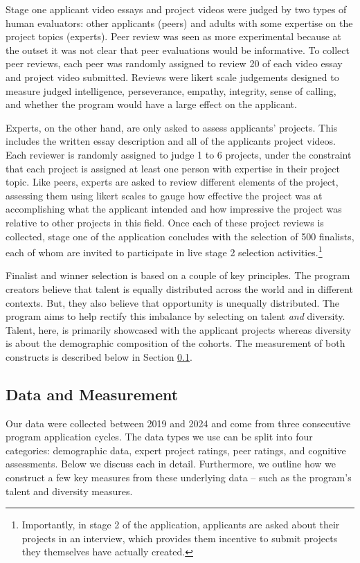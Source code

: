 Stage one applicant video essays and project videos were judged by two types of human evaluators: other applicants (peers) and adults with some expertise on the project topics (experts). Peer review was seen as more experimental because at the outset it was not clear that peer evaluations would be informative. To collect peer reviews, each peer was randomly assigned to review 20 of each video essay and project video submitted. Reviews were likert scale judgements designed to measure judged intelligence, perseverance, empathy, integrity, sense of calling, and whether the program would have a large effect on the applicant. 

Experts, on the other hand, are only asked to assess applicants' projects. This includes the written essay description and all of the applicants project videos. Each reviewer is randomly assigned to judge 1 to 6 projects, under the constraint that each project is assigned at least one person with expertise in their project topic. Like peers, experts are asked to review different elements of the project, assessing them using likert scales to gauge how effective the project was at accomplishing what the applicant intended and how impressive the project was relative to other projects in this field. Once each of these project reviews is collected, stage one of the application concludes with the selection of 500 finalists, each of whom are invited to participate in live stage 2 selection activities.\footnote{Importantly, in stage 2 of the application, applicants are asked about their projects in an interview, which provides them incentive to submit projects they themselves have actually created.} 

Finalist and winner selection is based on a couple of key principles. The program creators believe that talent is equally distributed across the world and in different contexts. But, they also believe that opportunity is unequally distributed. The program aims to help rectify this imbalance by selecting on talent \emph{and} diversity. Talent, here, is primarily showcased with the applicant projects whereas diversity is about the demographic composition of the cohorts. The measurement of both constructs is described below in Section \ref{subsec:data}. 

\subsection{Data and Measurement} \label{subsec:data}

Our data were collected between 2019 and 2024 and come from three consecutive program application cycles. The data types we use can be split into four categories: demographic data, expert project ratings, peer ratings, and cognitive assessments. Below we discuss each in detail. Furthermore, we outline how we construct a few key measures from these underlying data -- such as the program's talent and diversity measures. 


